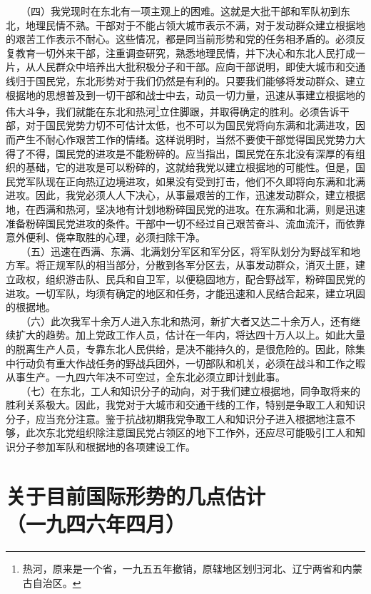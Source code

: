 \documentclass[cn,11pt,chinese]{elegantbook}
\def\myformat#1{\hfil\hfil #1}
\begin{document}
　　（四）我党现时在东北有一项主观上的困难。这就是大批干部和军队初到东北，地理民情不熟。干部对于不能占领大城市表示不满，对于发动群众建立根据地的艰苦工作表示不耐心。这些情况，都是同当前形势和党的任务相矛盾的。必须反复教育一切外来干部，注重调查研究，熟悉地理民情，并下决心和东北人民打成一片，从人民群众中培养出大批积极分子和干部。应向干部说明，即使大城市和交通线归于国民党，东北形势对于我们仍然是有利的。只要我们能够将发动群众、建立根据地的思想普及到一切干部和战士中去，动员一切力量，迅速从事建立根据地的伟大斗争，我们就能在东北和热河\footnote[3]{ 热河，原来是一个省，一九五五年撤销，原辖地区划归河北、辽宁两省和内蒙古自治区。}立住脚跟，并取得确定的胜利。必须告诉干部，对于国民党势力切不可估计太低，也不可以为国民党将向东满和北满进攻，因而产生不耐心作艰苦工作的情绪。这样说明时，当然不要使干部觉得国民党势力大得了不得，国民党的进攻是不能粉碎的。应当指出，国民党在东北没有深厚的有组织的基础，它的进攻是可以粉碎的，这就给我党以建立根据地的可能性。但是，国民党军队现在正向热辽边境进攻，如果没有受到打击，他们不久即将向东满和北满进攻。因此，我党必须人人下决心，从事最艰苦的工作，迅速发动群众，建立根据地，在西满和热河，坚决地有计划地粉碎国民党的进攻。在东满和北满，则是迅速准备粉碎国民党进攻的条件。干部中一切不经过自己艰苦奋斗、流血流汗，而依靠意外便利、侥幸取胜的心理，必须扫除干净。\\
　　（五）迅速在西满、东满、北满划分军区和军分区，将军队划分为野战军和地方军。将正规军队的相当部分，分散到各军分区去，从事发动群众，消灭土匪，建立政权，组织游击队、民兵和自卫军，以便稳固地方，配合野战军，粉碎国民党的进攻。一切军队，均须有确定的地区和任务，才能迅速和人民结合起来，建立巩固的根据地。\\
　　（六）此次我军十余万人进入东北和热河，新扩大者又达二十余万人，还有继续扩大的趋势。加上党政工作人员，估计在一年内，将达四十万人以上。如此大量的脱离生产人员，专靠东北人民供给，是决不能持久的，是很危险的。因此，除集中行动负有重大作战任务的野战兵团外，一切部队和机关，必须在战斗和工作之暇从事生产。一九四六年决不可空过，全东北必须立即计划此事。\\
　　（七）在东北，工人和知识分子的动向，对于我们建立根据地，同争取将来的胜利关系极大。因此，我党对于大城市和交通干线的工作，特别是争取工人和知识分子，应当充分注意。鉴于抗战初期我党争取工人和知识分子进入根据地注意不够，此次东北党组织除注意国民党占领区的地下工作外，还应尽可能吸引工人和知识分子参加军队和根据地的各项建设工作。\\
\newpage\section*{\myformat{关于目前国际形势的几点估计}\\\myformat{（一九四六年四月）}}
\end{document}
